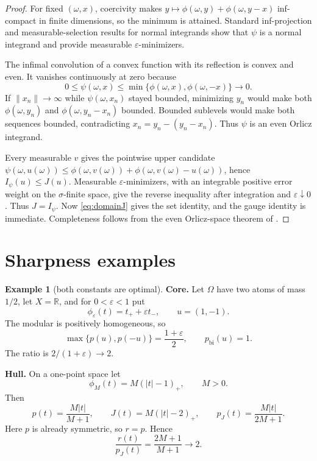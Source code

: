 \documentclass[11pt]{article}
\theoremstyle{definition}
\newtheorem{example}[theorem]{Example}
\newcommand{\R}{\mathbb R}
\newcommand{\pJ}{p_J}
\newcommand{\eps}{\varepsilon}
\begin{document}
\begin{proof}
For fixed $(\omega,x)$, coercivity makes
$y\mapsto\phi(\omega,y)+\phi(\omega,y-x)$ inf-compact in finite
dimensions, so the minimum is attained.  Standard inf-projection and
measurable-selection results for normal integrands
\cite[Chapter 14]{RockafellarWets} show that $\psi$ is a normal integrand
and provide measurable $\eps$-minimizers.

The infimal convolution of a convex function with its reflection is convex
and even.  It vanishes continuously at zero because
\[
 0\le\psi(\omega,x)
 \le\min\{\phi(\omega,x),\phi(\omega,-x)\}\longrightarrow0.
\]
If $\|x_n\|\to\infty$ while $\psi(\omega,x_n)$ stayed bounded, minimizing
$y_n$ would make both $\phi(\omega,y_n)$ and
$\phi(\omega,y_n-x_n)$ bounded.  Bounded sublevels would make both
sequences bounded, contradicting $x_n=y_n-(y_n-x_n)$.  Thus $\psi$ is an
even Orlicz integrand.

Every measurable $v$ gives the pointwise upper candidate
$\psi(\omega,u(\omega))\le
\phi(\omega,v(\omega))+\phi(\omega,v(\omega)-u(\omega))$, hence
$I_\psi(u)\le J(u)$.  Measurable $\eps$-minimizers, with an integrable
positive error weight on the $\sigma$-finite space, give the reverse
inequality after integration and $\eps\downarrow0$.  Thus $J=I_\psi$.
Now \eqref{eq:domainJ} gives the set identity, and the gauge identity is
immediate.  Completeness follows from the even Orlicz-space theorem of
\cite{Ruf2023}.
\end{proof}

\section{Sharpness examples}

\begin{example}[both constants are optimal]\label{ex:sharp}
\textbf{Core.}  Let $\Omega$ have two atoms of mass $1/2$, let $X=\R$, and
for $0<\eps<1$ put
\[
 \phi_\eps(t)=t_++\eps t_-,\qquad u=(1,-1).
\]
The modular is positively homogeneous, so
\[
 \max\{p(u),p(-u)\}=\frac{1+\eps}{2},\qquad
 p_{\mathrm{bi}}(u)=1.
\]
The ratio is $2/(1+\eps)\to2$.

\smallskip
\textbf{Hull.}  On a one-point space let
\[
 \phi_M(t)=M(|t|-1)_+,\qquad M>0.
\]
Then
\[
 p(t)=\frac{M|t|}{M+1},\qquad
 J(t)=M(|t|-2)_+,\qquad
 \pJ(t)=\frac{M|t|}{2M+1}.
\]
Here $p$ is already symmetric, so $r=p$.  Hence
\[
 \frac{r(t)}{\pJ(t)}=\frac{2M+1}{M+1}\longrightarrow2.
\]
\end{example}
\end{document}
